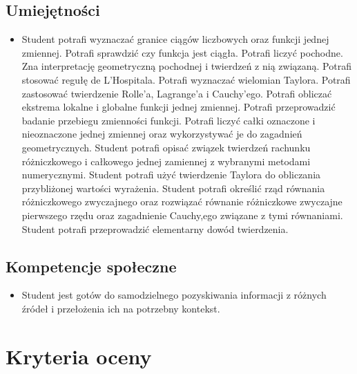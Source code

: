 \documentclass[12pt, a4paper]{article}
\begin{document}
\subsection*{Umiejętności}
\begin{itemize}
  \item Student potrafi wyznaczać granice ciągów liczbowych oraz funkcji jednej zmiennej. Potrafi sprawdzić czy funkcja jest ciągła.  Potrafi liczyć pochodne. Zna interpretację geometryczną pochodnej i twierdzeń z nią związaną. Potrafi stosować  regułę de L'Hospitala. Potrafi  wyznaczać wielomian Taylora.  Potrafi zastosować twierdzenie Rolle’a, Lagrange’a i Cauchy’ego. Potrafi  obliczać ekstrema lokalne i globalne funkcji jednej zmiennej.  Potrafi przeprowadzić badanie przebiegu zmienności funkcji. Potrafi liczyć całki oznaczone i nieoznaczone jednej zmiennej oraz wykorzystywać je do zagadnień geometrycznych. Student potrafi opisać związek twierdzeń rachunku różniczkowego i całkowego jednej zamiennej z wybranymi metodami numerycznymi. Student potrafi użyć twierdzenie Taylora do obliczania przybliżonej wartości wyrażenia. Student potrafi określić rząd równania różniczkowego zwyczajnego oraz rozwiązać równanie różniczkowe zwyczajne pierwszego rzędu oraz zagadnienie Cauchy,ego związane z tymi równaniami. Student potrafi przeprowadzić elementarny dowód twierdzenia.
\end{itemize}

\subsection*{Kompetencje społeczne}
\begin{itemize}
  \item Student jest gotów do samodzielnego pozyskiwania informacji z różnych źródeł i przełożenia ich na potrzebny kontekst.
\end{itemize}

\section{Kryteria oceny}
\end{document}
